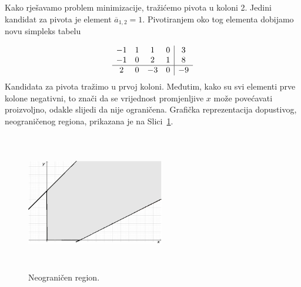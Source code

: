 \documentclass[b5paper, utf8, 11pt, colorlinks]{book}
\theoremstyle{definition}
\begin{document}
Kako rješavamo problem minimizacije, tražićemo pivota u koloni 2. Jedini kandidat za pivota je element  $\overline{a}_{1, 2} = 1$. Pivotiranjem oko tog elementa dobijamo novu simpleks tabelu 

$$\begin{array}{cccc| c} 
	-1 & 1  & 1  &  0 & 3 \\
	-1 & 0  & 2  &  1 & 8 \\ \hline
	2  & 0  & -3 &  0 & -9 \\
\end{array}$$
Kandidata za pivota tražimo u prvoj koloni. Međutim, kako su svi elementi prve kolone negativni, to znači da se 
vrijednost  promjenljive $x$  može povećavati proizvoljno, odakle slijedi da nije ograničena. 
Grafička reprezentacija dopustivog, neograničenog regiona, prikazana je na  Slici~\ref{fig:unbounded-example-solve}. 


\begin{figure}[!ht]
	\centering
	\includegraphics[width=170pt,height=170pt]{unbounded-example-solve.eps}
	\caption{Neograničen region.}
	\label{fig:unbounded-example-solve}
\end{figure}
\end{document}
